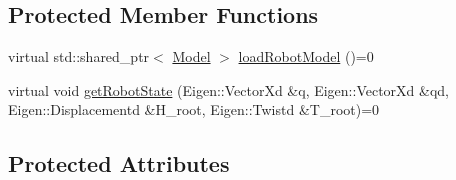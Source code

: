 \subsection*{Protected Member Functions}
\begin{DoxyCompactItemize}
\item 
virtual std\+::shared\+\_\+ptr$<$ \hyperlink{classocra_1_1Model}{Model} $>$ \hyperlink{classocra__recipes_1_1ControllerServer_a50715d81293d3ec5f0d6a60710008510}{load\+Robot\+Model} ()=0
\item 
virtual void \hyperlink{classocra__recipes_1_1ControllerServer_a93ec150bea9b2a7a03aac1cc048d5484}{get\+Robot\+State} (Eigen\+::\+Vector\+Xd \&q, Eigen\+::\+Vector\+Xd \&qd, Eigen\+::\+Displacementd \&H\+\_\+root, Eigen\+::\+Twistd \&T\+\_\+root)=0
\end{DoxyCompactItemize}
\subsection*{Protected Attributes}
